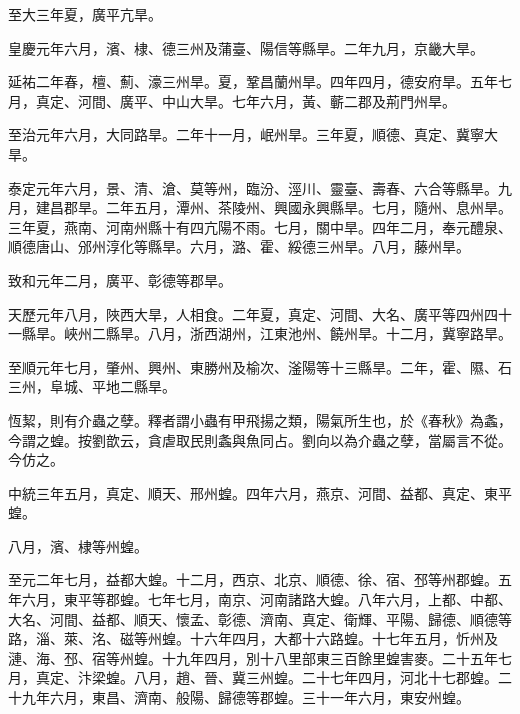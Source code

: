 \begin{pinyinscope}
 至大三年夏，廣平亢旱。



 皇慶元年六月，濱、棣、德三州及蒲臺、陽信等縣旱。二年九月，京畿大旱。



 延祐二年春，檀、薊、濠三州旱。夏，鞏昌蘭州旱。四年四月，德安府旱。五年七月，真定、河間、廣平、中山大旱。七年六月，黃、蘄二郡及荊門州旱。



 至治元年六月，大同路旱。二年十一月，岷州旱。三年夏，順德、真定、冀寧大旱。



 泰定元年六月，景、清、滄、莫等州，臨汾、涇川、靈臺、壽春、六合等縣旱。九月，建昌郡旱。二年五月，潭州、茶陵州、興國永興縣旱。七月，隨州、息州旱。三年夏，燕南、河南州縣十有四亢陽不雨。七月，關中旱。四年二月，奉元醴泉、順德唐山、邠州淳化等縣旱。六月，潞、霍、綏德三州旱。八月，藤州旱。



 致和元年二月，廣平、彰德等郡旱。



 天歷元年八月，陜西大旱，人相食。二年夏，真定、河間、大名、廣平等四州四十一縣旱。峽州二縣旱。八月，浙西湖州，江東池州、饒州旱。十二月，冀寧路旱。



 至順元年七月，肇州、興州、東勝州及榆次、滏陽等十三縣旱。二年，霍、隰、石三州，阜城、平地二縣旱。



 恆絜，則有介蟲之孽。釋者謂小蟲有甲飛揚之類，陽氣所生也，於《春秋》為螽，今謂之蝗。按劉歆云，貪虐取民則螽與魚同占。劉向以為介蟲之孽，當屬言不從。今仿之。



 中統三年五月，真定、順天、邢州蝗。四年六月，燕京、河間、益都、真定、東平蝗。



 八月，濱、棣等州蝗。



 至元二年七月，益都大蝗。十二月，西京、北京、順德、徐、宿、邳等州郡蝗。五年六月，東平等郡蝗。七年七月，南京、河南諸路大蝗。八年六月，上都、中都、大名、河間、益都、順天、懷孟、彰德、濟南、真定、衛輝、平陽、歸德、順德等路，淄、萊、洺、磁等州蝗。十六年四月，大都十六路蝗。十七年五月，忻州及漣、海、邳、宿等州蝗。十九年四月，別十八里部東三百餘里蝗害麥。二十五年七月，真定、汴梁蝗。八月，趙、晉、冀三州蝗。二十七年四月，河北十七郡蝗。二十九年六月，東昌、濟南、般陽、歸德等郡蝗。三十一年六月，東安州蝗。




\end{pinyinscope}
